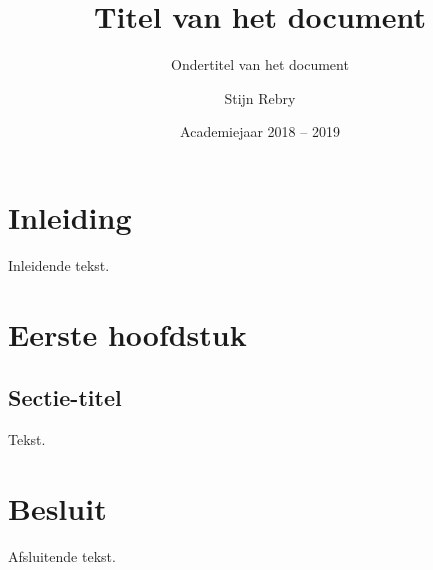 \documentclass[a4paper,twoside,kulak]{kulakreport} %
\title{Titel van het document}
\subtitle{Ondertitel van het document}
\author{Stijn Rebry}
\institute{KU Leuven Kulak, Wetenschap \& Technologie}
\date{Academiejaar 2018 -- 2019}
\begin{document}

\titlepage

\tableofcontents

\chapter*{Inleiding}
Inleidende tekst.

\chapter{Eerste hoofdstuk}
\section{Sectie-titel}
Tekst.

\chapter*{Besluit}
Afsluitende tekst.
\end{document}
